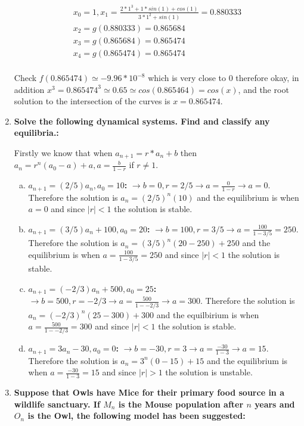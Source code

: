 \documentclass{article}
\begin{document}
\begin{enumerate}[1.]
\begin{gather*}
x_0 = 1, x_1 = \frac{2* 1^3 + 1 * sin(1) + cos(1)}{3 * 1^2 + sin(1)} = 0.880333 \\
x_2 = g(0.880333) = 0.865684 \\
x_3 = g(0.865684) = 0.865474 \\
x_4 = g(0.865474) = 0.865474 \\
\end{gather*}

Check $f(0.865474) \simeq -9.96 * 10^{-8}$ which is very close to 0 therefore okay, in addition $x^3 = 0.865474^3 \simeq 0.65 \simeq cos(0.865464) = cos(x)$, and the root solution to the intersection of the curves is $x = 0.865474$.

\item
\textbf{Solve the following dynamical systems. Find and classify any equilibria.:}

Firstly we know that when $a_{n+1} = r*a_n + b$ then $a_n = r^n(a_0 - a) + a, a = \frac{b}{1-r}$ if $r \neq 1$.

\begin{enumerate}[(a)]
  \item \textbf{$a_{n+1} = (2/5)a_n, a_0 = 10$:} 
$\to b = 0, r=2/5 \to a = \frac{0}{1 - r} \to a = 0$. Therefore the solution is $a_n = (2/5)^n(10)$ and the equilibrium is when $a = 0$ and since $|r| < 1$ the solution is stable.

  \item \textbf{$a_{n+1} = (3/5)a_n + 100, a_0 = 20$:}
$\to b = 100, r = 3/5 \to a = \frac{100}{1 - 3/5} = 250$. Therefore the solution is $a_n = (3/5)^n(20 - 250) + 250$ and the equilibrium is when $a = \frac{100}{1 - 3/5} = 250$ and since $|r| < 1$ the solution is stable.

  \item \textbf{$a_{n+1} = (-2/3)a_n + 500, a_0 = 25$:} 
$\to b = 500, r=-2/3 \to a = \frac{500}{1 - -2/3} \to a = 300$. 
Therefore the solution is $a_n = (-2/3)^n(25 - 300) + 300$ and the equilbirium is when $a = \frac{500}{1 - -2/3} = 300$ and since $|r| < 1$ the solution is stable.

  \item \textbf{$a_{n+1} = 3a_n - 30, a_0 = 0$:} 
$\to b = -30, r=3 \to a = \frac{-30}{1 - 3} \to a = 15$. Therefore the solution is $a_n = 3^n(0 - 15) + 15$ and the equilibrium is when $a = \frac{-30}{1-3} = 15$ and since $|r| > 1$ the solution is unstable.
\end{enumerate}

\item 
\textbf{Suppose that Owls have Mice for their primary food source in a wildlife sanctuary. If $M_n$ is the Mouse population after $n$ years and $O_n$ is the Owl, the following model has been suggested:}


\end{enumerate}
\end{document}
